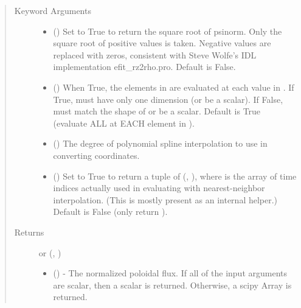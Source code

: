 \documentclass[letterpaper,10pt,english]{sphinxmanual}
\begin{document}
\begin{fulllineitems}
\begin{fulllineitems}
\begin{quote}
\begin{description}
\begin{itemize}
\end{itemize}

\item[{Keyword Arguments}] \leavevmode\begin{itemize}
\item {} 
 () \textendash{} Set to True to return the square root of psinorm.
Only the square root of positive values is taken. Negative
values are replaced with zeros, consistent with Steve Wolfe’s
IDL implementation efit\_rz2rho.pro. Default is False.

\item {} 
 () \textendash{} When True, the elements in  are evaluated at
each value in . If True,  must have only one dimension (or
be a scalar). If False,  must match the shape of  or be a
scalar. Default is True (evaluate ALL  at EACH element
in ).

\item {} 
 () \textendash{} The degree of polynomial spline interpolation to
use in converting coordinates.

\item {} 
 () \textendash{} Set to True to return a tuple of (,
), where  is the array of time indices
actually used in evaluating  with nearest-neighbor
interpolation. (This is mostly present as an internal helper.)
Default is False (only return ).

\end{itemize}

\item[{Returns}] \leavevmode

 or (, )
\begin{itemize}
\item {} 
 () - The normalized poloidal
flux. If all of the input arguments are scalar, then a scalar is
returned. Otherwise, a scipy Array is returned.


\end{itemize}
\end{description}
\end{quote}
\end{fulllineitems}
\end{fulllineitems}
\end{document}
